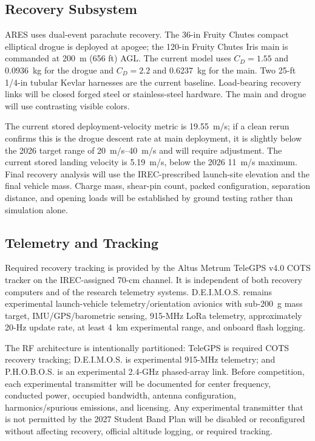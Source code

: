 \documentclass[10pt]{article}
\newcommand{\DEIMOS}{D.E.I.M.O.S.}
\newcommand{\PHOBOS}{P.H.O.B.O.S.}
\begin{document}
\subsection{Recovery Subsystem}
ARES uses dual-event parachute recovery. The 36-in Fruity Chutes compact elliptical drogue is deployed at apogee; the 120-in Fruity Chutes Iris main is commanded at \SI{200}{m} (656 ft) AGL. The current model uses \(C_D=1.55\) and \SI{0.0936}{kg} for the drogue and \(C_D=2.2\) and \SI{0.6237}{kg} for the main. Two 25-ft 1/4-in tubular Kevlar harnesses are the current baseline. Load-bearing recovery links will be closed forged steel or stainless-steel hardware. The main and drogue will use contrasting visible colors.

The current stored deployment-velocity metric is \SI{19.55}{m/s}; if a clean rerun confirms this is the drogue descent rate at main deployment, it is slightly below the 2026 target range of \SIrange{20}{40}{m/s} and will require adjustment. The current stored landing velocity is \SI{5.19}{m/s}, below the 2026 \SI{11}{m/s} maximum. Final recovery analysis will use the IREC-prescribed launch-site elevation and the final vehicle mass. Charge mass, shear-pin count, packed configuration, separation distance, and opening loads will be established by ground testing rather than simulation alone.

\subsection{Telemetry and Tracking}
Required recovery tracking is provided by the Altus Metrum TeleGPS v4.0 COTS tracker on the IREC-assigned 70-cm channel. It is independent of both recovery computers and of the research telemetry systems. \DEIMOS{} remains experimental launch-vehicle telemetry/orientation avionics with sub-\SI{200}{g} mass target, IMU/GPS/barometric sensing, 915-MHz LoRa telemetry, approximately 20-Hz update rate, at least \SI{4}{km} experimental range, and onboard flash logging.

The RF architecture is intentionally partitioned: TeleGPS is required COTS recovery tracking; \DEIMOS{} is experimental 915-MHz telemetry; and \PHOBOS{} is an experimental 2.4-GHz phased-array link. Before competition, each experimental transmitter will be documented for center frequency, conducted power, occupied bandwidth, antenna configuration, harmonics/spurious emissions, and licensing. Any experimental transmitter that is not permitted by the 2027 Student Band Plan will be disabled or reconfigured without affecting recovery, official altitude logging, or required tracking.
\end{document}
